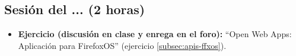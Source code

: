\documentclass[a4paper,12pt]{report}
\begin{document}
\subsection{Sesión del ... (2 horas)}

\begin{itemize}
\item \textbf{Ejercicio (discusión en clase y enrega en el foro):} ``Open Web Apps: Aplicación para FirefoxOS'' (ejercicio \ref{subsec:apis-ffxos}).
\end{itemize}





\end{document}
